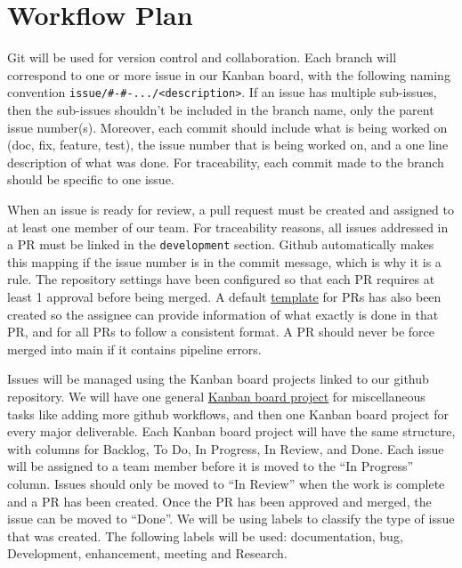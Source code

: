 \documentclass{article}
\begin{document}
\section{Workflow Plan}

Git will be used for version control and collaboration. Each branch will
correspond to one or more issue in our Kanban board, with the following naming
convention \texttt{issue/\#<issue-number1>-\#<issue-number2>-.../<description>}.
If an issue has multiple sub-issues, then the sub-issues shouldn't be included
in the branch name, only the parent issue number(s). Moreover, each commit
should include what is being worked on (doc, fix, feature, test), the issue 
number that is being worked on, and a one line description of what was done.
For traceability, each commit made to the branch should be specific to one
issue.

When an issue is ready for review, a pull request must be created and assigned
to at least one member of our team. For traceability reasons, all issues
addressed in a PR must be linked in the \texttt{development} section. Github
automatically makes this mapping if the issue number is in the commit message,
which is why it is a rule. The repository settings have been configured so that
each PR requires at least 1 approval before being merged. A default
\href{https://github.com/Team6-SixSense/audio360/blob/main/.github/pull_request_template.md}{template}
for PRs has also been created so the assignee can provide information of what
exactly is done in that PR, and for all PRs to follow a consistent format. A PR
should never be force merged into main if it contains pipeline errors.

Issues will be managed using the Kanban board projects linked to our github
repository. We will have one general 
\href{https://github.com/orgs/Team6-SixSense/projects/1}{Kanban board project} 
for miscellaneous
tasks like adding more github workflows, and then one Kanban board project for
every major deliverable. Each Kanban board project will have the same structure,
with columns for Backlog, To Do, In Progress, In Review, and Done. Each issue
will be assigned to a team member before it is moved to the ``In Progress''
column. Issues should only be moved to ``In Review'' when the work is complete
and a PR has been created. Once the PR has been approved and merged, the issue
can be moved to ``Done''. We will be using labels to classify the type of issue
that was created. The following labels will be used: documentation, bug,
Development, enhancement, meeting and Research.
\end{document}
